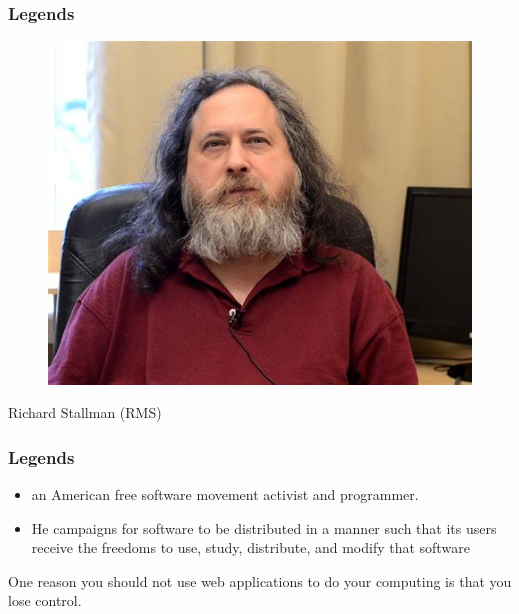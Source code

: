 \documentclass{../c-lecture}
\begin{document}
\begin{frame}
  \frametitle{Legends}
  \begin{figure}
    \includegraphics[height=.75\textheight]{./img/stallman.jpg}
  \end{figure}
  \pause%
  \centering
  \color{Violet} Richard Stallman (RMS)
\end{frame}

\begin{frame}
  \frametitle{Legends}
  \begin{itemize}
    \item an American free software movement activist and programmer.
    \item He campaigns for software to be distributed in a manner such that its users receive the freedoms to use, study, distribute, and modify that software
  \end{itemize}
  \begin{block}{}
    One reason you should not use web applications to do your computing is that you lose control.
  \end{block}
\end{frame}
\end{document}

